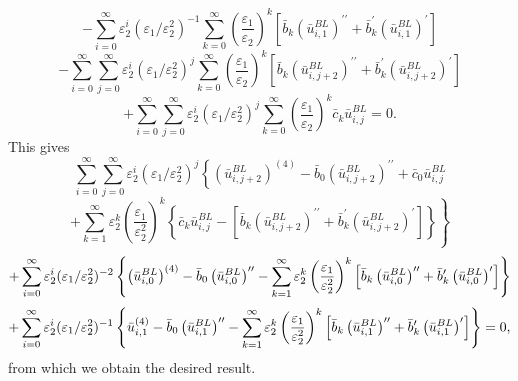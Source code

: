 \documentclass[12pt]{article}
\begin{document}
\begin{equation*}-\sum_{i=0}^{\infty} \varepsilon _{2}^{i}(\varepsilon _{1}/\varepsilon
_{2}^{2})^{-1}\sum_{k=0}^{\infty }\left( \frac{\varepsilon _{1}}{\varepsilon _{2}}%
\right) ^{k}\left[ \bar{b}_{k}\left(\bar{u}^{BL}_{i,1}\right)^{\prime \prime }+\bar{b}_{k}^{\prime }\left(\bar{u}^{BL}_{i,1}\right)^{\prime }\right]
\end{equation*}
%
\begin{equation*}-\sum_{i=0}^{\infty
}\sum_{j=0}^{\infty }\varepsilon _{2}^{i}(\varepsilon _{1}/\varepsilon
_{2}^{2})^{j}\sum_{k=0}^{\infty }\left( \frac{\varepsilon _{1}}{\varepsilon _{2}}%
\right) ^{k}\left[ \bar{b}_{k}\left(\bar{u}^{BL}_{i,j+2}\right)^{\prime \prime }+\bar{b}_{k}^{\prime }\left(\bar{u}^{BL}_{i,j+2}\right)^{\prime }\right]
\end{equation*}%
\begin{equation*}
+\sum_{i=0}^{\infty }\sum_{j=0}^{\infty }\varepsilon _{2}^{i}(\varepsilon
_{1}/\varepsilon _{2}^{2})^{j}\sum_{k=0}^{\infty }\left( \frac{\varepsilon
_{1}}{\varepsilon _{2}}\right) ^{k}\bar{c}_{k}\bar{u}^{BL}_{i,j}=0.
\end{equation*}
%
This gives
%
\begin{equation*}
\sum_{i=0}^{\infty }\sum_{j=0}^{\infty }\varepsilon _{2}^{i}(\varepsilon
_{1}/\varepsilon _{2}^{2})^{j}\left\{\left( \bar{u}^{BL}_{i,j+2}\right)^{(4)}-\bar{b}_{0}\left(\bar{u}^{BL}_{i,j+2}\right)^{\prime \prime }+\bar{c}_{0}\bar{u}^{BL}_{i,j} \right.
\end{equation*}
%
\begin{equation*}
\left. +\sum_{k=1}^{\infty }\varepsilon _{2}^{k}\left( \frac{\varepsilon _{1}}{\varepsilon _{2}^{2}}%
\right) ^{k}\left\{ \bar{c}_{k}\bar{u}^{BL}_{i,j}-\left[ \bar{b}_{k}\left(\bar{u}^{BL}_{i,j+2}\right)^{\prime \prime }+\bar{b}_{k}^{\prime }\left(\bar{u}^{BL}_{i,j+2}\right)^{\prime }\right] \right\} \right\}
\end{equation*}
%
\begin{equation*}
+\sum_{i=0}^{\infty }\varepsilon _{2}^{i}(\varepsilon _{1}/\varepsilon
_{2}^{2})^{-2}\left\{ \left(\bar{u}^{BL}_{i,0}\right)^{(4)}-\bar{b}_{0}\left(\bar{u}^{BL}_{i,0}\right)^{\prime \prime }-\sum_{k=1}^{\infty }\varepsilon _{2}^{k}\left( \frac{%
\varepsilon _{1}}{\varepsilon _{2}^{2}}\right) ^{k}\left[ \bar{b}_{k}\left(\bar{u}^{BL}_{i,0}\right)^{\prime \prime }+\bar{b}_{k}^{\prime }\left(\bar{u}^{BL}_{i,0}\right)^{\prime }\right] \right\}
\end{equation*}
%
\begin{equation*}
+\sum_{i=0}^{\infty
}\varepsilon _{2}^{i}(\varepsilon _{1}/\varepsilon _{2}^{2})^{-1}\left\{ 
\bar{u}_{i,1}^{(4)}-\bar{b}_{0}\left(\bar{u}^{BL}_{i,1}\right)^{\prime \prime }-\sum_{k=1}^{\infty }\varepsilon _{2}^{k}\left( \frac{%
\varepsilon _{1}}{\varepsilon _{2}^{2}}\right) ^{k}\left[ \bar{b}_{k}\left(\bar{u}^{BL}_{i,1}\right)^{\prime \prime }+\bar{b}_{k}^{\prime }\left(\bar{u}^{BL}_{i,1}\right)^{\prime }\right] \right\} =0,
\end{equation*}
%
from which we obtain the desired result.
\end{document}
